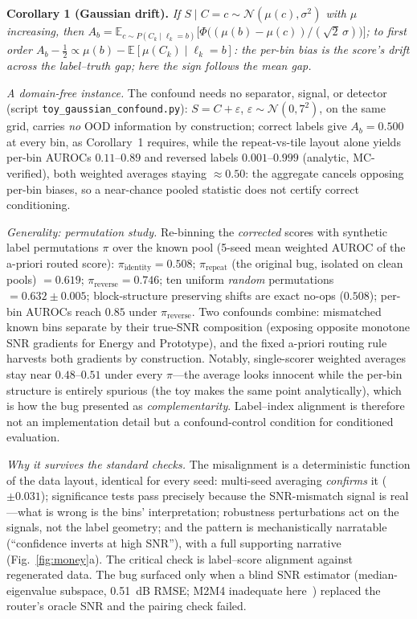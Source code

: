 \documentclass[journal,letterpaper]{IEEEtran}
\begin{document}
\textbf{Corollary 1 (Gaussian drift).} \emph{If $S \mid C{=}c \sim
\mathcal{N}(\mu(c), \sigma^2)$ with $\mu$ increasing, then
$A_b = \mathbb{E}_{c \sim P(C_k \mid \ell_k {=} b)}\bigl[\Phi\bigl(
(\mu(b) - \mu(c)) / (\sqrt{2}\,\sigma)\bigr)\bigr]$; to first order
$A_b - \tfrac{1}{2} \propto \mu(b) - \mathbb{E}[\mu(C_k) \mid
\ell_k {=} b]$: the per-bin bias is the score's drift across the
label--truth gap; here the sign follows the mean gap.}

\emph{A domain-free instance.} The confound needs no separator, signal,
or detector (script \texttt{toy\_gaussian\_confound.py}): $S = C +
\varepsilon$, $\varepsilon \sim \mathcal{N}(0, 7^2)$, on the same grid,
carries \emph{no} OOD information by construction; correct labels give
$A_b = 0.500$ at every bin, as Corollary~1 requires, while the
repeat-vs-tile layout alone yields per-bin AUROCs $0.11$--$0.89$ and
reversed labels $0.001$--$0.999$ (analytic, MC-verified), both
weighted averages staying $\approx 0.50$: the aggregate cancels
opposing per-bin biases, so a near-chance pooled statistic does not
certify correct conditioning.

\emph{Generality: permutation study.} Re-binning
the \emph{corrected} scores with synthetic label permutations $\pi$
over the known pool (5-seed mean weighted AUROC of the a-priori routed
score): $\pi_{\text{identity}} = 0.508$; $\pi_{\text{repeat}}$ (the
original bug, isolated on clean pools) $= 0.619$;
$\pi_{\text{reverse}} = 0.746$; ten uniform
\emph{random} permutations $= 0.632 \pm 0.005$; block-structure
preserving shifts are exact no-ops ($0.508$); per-bin AUROCs reach
$0.85$ under $\pi_{\text{reverse}}$. Two confounds combine: mismatched
known bins separate by their true-SNR composition (exposing opposite
monotone SNR gradients for Energy and Prototype), and the fixed
a-priori routing rule harvests both gradients by construction. Notably,
single-scorer weighted averages stay near $0.48$--$0.51$ under every
$\pi$---the average looks innocent while the per-bin structure is
entirely spurious (the toy makes the same point analytically), which is
how the bug presented as \emph{complementarity}. Label--index
alignment is therefore not an implementation detail but a
confound-control condition for conditioned evaluation.

\emph{Why it survives the standard checks.} The misalignment is a
deterministic function of the data layout, identical for every seed:
multi-seed averaging \emph{confirms} it ($\pm 0.031$); significance
tests pass precisely because the SNR-mismatch signal is real---what is
wrong is the bins' interpretation; robustness perturbations act on the
signals, not the label geometry; and the pattern is mechanistically
narratable (``confidence inverts at high SNR''), with a full supporting
narrative (Fig.~\ref{fig:money}a). The critical check is label--score
alignment against regenerated data. The bug surfaced only when a blind SNR
estimator (median-eigenvalue subspace, \SI{0.51}{dB} RMSE; M2M4
inadequate here~\cite{pauluzzi2000snr}) replaced the router's oracle
SNR and the pairing check failed.
\end{document}
